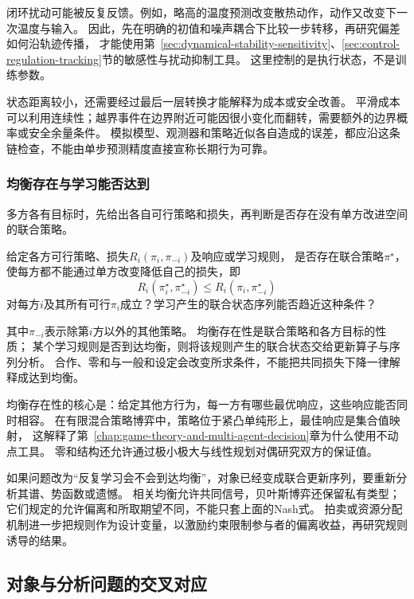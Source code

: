 闭环扰动可能被反复反馈。例如，略高的温度预测改变散热动作，动作又改变下一次温度与输入。
因此，先在明确的初值和噪声耦合下比较一步转移，再研究偏差如何沿轨迹传播，
才能使用第~\ref{sec:dynamical-stability-sensitivity}、\ref{sec:control-regulation-tracking}节的敏感性与扰动抑制工具。
这里控制的是执行状态，不是训练参数。

状态距离较小，还需要经过最后一层转换才能解释为成本或安全改善。
平滑成本可以利用连续性；越界事件在边界附近可能因很小变化而翻转，需要额外的边界概率或安全余量条件。
模拟模型、观测器和策略近似各自造成的误差，都应沿这条链检查，不能由单步预测精度直接宣称长期行为可靠。

\subsubsection{均衡存在与学习能否达到}
\label{sec:future-analysis-equilibrium}

多方各有目标时，先给出各自可行策略和损失，再判断是否存在没有单方改进空间的联合策略。

\begin{mathproblem}[多方响应能否达到所求均衡]
  \label{question:future-equilibrium}
  给定各方可行策略、损失$R_i(\pi_i,\pi_{-i})$及响应或学习规则，
  是否存在联合策略$\pi^\star$，使每方都不能通过单方改变降低自己的损失，即
  \[
    R_i(\pi_i^\star,\pi_{-i}^\star)
    \leq R_i(\pi_i,\pi_{-i}^\star)
  \]
  对每方$i$及其所有可行$\pi_i$成立？学习产生的联合状态序列能否趋近这种条件？
\end{mathproblem}

其中$\pi_{-i}$表示除第$i$方以外的其他策略。
均衡存在性是联合策略和各方目标的性质；
某个学习规则是否到达均衡，则将该规则产生的联合状态交给更新算子与序列分析。
合作、零和与一般和设定会改变所求条件，不能把共同损失下降一律解释成达到均衡。

均衡存在性的核心是：给定其他方行为，每一方有哪些最优响应，这些响应能否同时相容。
在有限混合策略博弈中，策略位于紧凸单纯形上，最佳响应是集合值映射，
这解释了第~\ref{chap:game-theory-and-multi-agent-decision}章为什么使用不动点工具。
零和结构还允许通过极小极大与线性规划对偶研究双方的保证值。

如果问题改为“反复学习会不会到达均衡”，对象已经变成联合更新序列，要重新分析其谱、势函数或遗憾。
相关均衡允许共同信号，贝叶斯博弈还保留私有类型；它们规定的允许偏离和所取期望不同，不能只套上面的Nash式。
拍卖或资源分配机制进一步把规则作为设计变量，以激励约束限制参与者的偏离收益，再研究规则诱导的结果。

\subsection{对象与分析问题的交叉对应}
\label{sec:future-mathematical-tool-roles}

